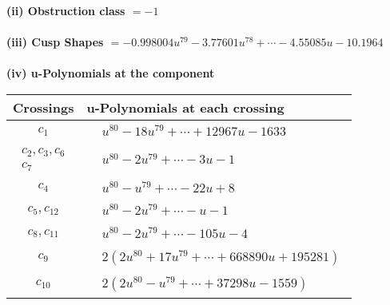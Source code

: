 \documentclass[1p]{elsarticle_modified}
\theoremstyle{definition}
\begin{document}
\flushleft \textbf{(ii) Obstruction class $= -1$}\\~\\
\flushleft \textbf{(iii) Cusp Shapes $= -0.998004 u^{79}-3.77601 u^{78}+\cdots-4.55085 u-10.1964$}\\~\\
\newpage\renewcommand{\arraystretch}{1}
\flushleft \textbf{(iv) u-Polynomials at the component}\newline \\
\begin{tabular}{m{50pt}|m{274pt}}
Crossings & \hspace{64pt}u-Polynomials at each crossing \\
\hline $$\begin{aligned}c_{1}\end{aligned}$$&$\begin{aligned}
&u^{80}-18 u^{79}+\cdots+12967 u-1633
\end{aligned}$\\
\hline $$\begin{aligned}c_{2},c_{3},c_{6}\\c_{7}\end{aligned}$$&$\begin{aligned}
&u^{80}-2 u^{79}+\cdots-3 u-1
\end{aligned}$\\
\hline $$\begin{aligned}c_{4}\end{aligned}$$&$\begin{aligned}
&u^{80}- u^{79}+\cdots-22 u+8
\end{aligned}$\\
\hline $$\begin{aligned}c_{5},c_{12}\end{aligned}$$&$\begin{aligned}
&u^{80}-2 u^{79}+\cdots- u-1
\end{aligned}$\\
\hline $$\begin{aligned}c_{8},c_{11}\end{aligned}$$&$\begin{aligned}
&u^{80}-2 u^{79}+\cdots-105 u-4
\end{aligned}$\\
\hline $$\begin{aligned}c_{9}\end{aligned}$$&$\begin{aligned}
&2(2 u^{80}+17 u^{79}+\cdots+668890 u+195281)
\end{aligned}$\\
\hline $$\begin{aligned}c_{10}\end{aligned}$$&$\begin{aligned}
&2(2 u^{80}- u^{79}+\cdots+37298 u-1559)
\end{aligned}$\\
\hline
\end{tabular}\\~\\
\end{document}
